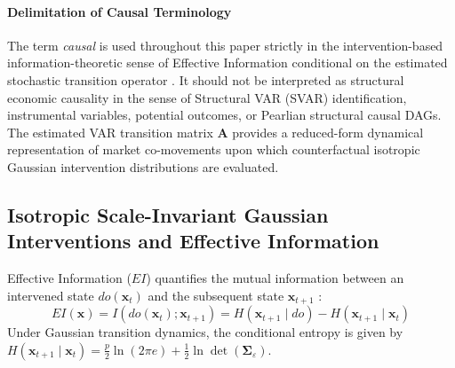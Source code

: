 \documentclass[review,12pt,authoryear]{elsarticle}
\begin{document}
\paragraph{Delimitation of Causal Terminology}
The term \emph{causal} is used throughout this paper strictly in the intervention-based information-theoretic sense of Effective Information conditional on the estimated stochastic transition operator \citep{hoel2013quantifying, liu2024exact}. It should not be interpreted as structural economic causality in the sense of Structural VAR (SVAR) identification, instrumental variables, potential outcomes, or Pearlian structural causal DAGs. The estimated VAR transition matrix $\mathbf{A}$ provides a reduced-form dynamical representation of market co-movements upon which counterfactual isotropic Gaussian intervention distributions are evaluated.

\subsection{Isotropic Scale-Invariant Gaussian Interventions and Effective Information}
Effective Information ($EI$) quantifies the mutual information between an intervened state $do(\mathbf{x}_t)$ and the subsequent state $\mathbf{x}_{t+1}$ \citep{hoel2013quantifying}:
\begin{equation}
EI(\mathbf{x}) = I(do(\mathbf{x}_t); \mathbf{x}_{t+1}) = H(\mathbf{x}_{t+1} \mid do) - H(\mathbf{x}_{t+1} \mid \mathbf{x}_t)
\label{eq:ei_def_eq}
\end{equation}
Under Gaussian transition dynamics, the conditional entropy is given by $H(\mathbf{x}_{t+1} \mid \mathbf{x}_t) = \frac{p}{2}\ln(2\pi e) + \frac{1}{2}\ln\det(\boldsymbol{\Sigma}_\varepsilon)$.
\end{document}
